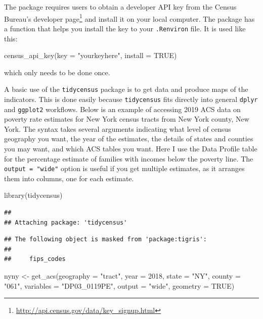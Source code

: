 \documentclass[
]{article}
\newenvironment{Shaded}{\begin{snugshade}}{\end{snugshade}}
\newcommand{\AttributeTok}[1]{\textcolor[rgb]{0.77,0.63,0.00}{#1}}
\newcommand{\ConstantTok}[1]{\textcolor[rgb]{0.00,0.00,0.00}{#1}}
\newcommand{\DecValTok}[1]{\textcolor[rgb]{0.00,0.00,0.81}{#1}}
\newcommand{\FunctionTok}[1]{\textcolor[rgb]{0.00,0.00,0.00}{#1}}
\newcommand{\NormalTok}[1]{#1}
\newcommand{\OtherTok}[1]{\textcolor[rgb]{0.56,0.35,0.01}{#1}}
\newcommand{\StringTok}[1]{\textcolor[rgb]{0.31,0.60,0.02}{#1}}
\begin{document}
The package requires users to obtain a developer API key from the Census Bureau's developer page\footnote{\url{http://api.census.gov/data/key_signup.html}} and install it on your local computer. The package has a function that helps you install the key to your \texttt{.Renviron} file. It is used like this:

\begin{Shaded}
\begin{Highlighting}[]
\FunctionTok{census\_api\_key}\NormalTok{(}\AttributeTok{key =} \StringTok{"yourkeyhere"}\NormalTok{, }\AttributeTok{install =} \ConstantTok{TRUE}\NormalTok{)}
\end{Highlighting}
\end{Shaded}

which only needs to be done once.

A basic use of the \texttt{tidycensus} package is to get data and produce maps of the indicators. This is done easily because \texttt{tidycensus} fits directly into general \texttt{dplyr} and \texttt{ggplot2} workflows. Below is an example of accessing 2019 ACS data on poverty rate estimates for New York census tracts from New York county, New York. The syntax takes several arguments indicating what level of census geography you want, the year of the estimates, the details of states and counties you may want, and which ACS tables you want. Here I use the Data Profile table for the percentage estimate of families with incomes below the poverty line. The \texttt{output\ =\ "wide"} option is useful if you get multiple estimates, as it arranges them into columns, one for each estimate.

\begin{Shaded}
\begin{Highlighting}[]
\FunctionTok{library}\NormalTok{(tidycensus)}
\end{Highlighting}
\end{Shaded}

\begin{verbatim}
## 
## Attaching package: 'tidycensus'
\end{verbatim}

\begin{verbatim}
## The following object is masked from 'package:tigris':
## 
##     fips_codes
\end{verbatim}

\begin{Shaded}
\begin{Highlighting}[]
\NormalTok{nyny }\OtherTok{\textless{}{-}} \FunctionTok{get\_acs}\NormalTok{(}\AttributeTok{geography =} \StringTok{"tract"}\NormalTok{,}
                \AttributeTok{year =} \DecValTok{2018}\NormalTok{,}
                \AttributeTok{state =} \StringTok{"NY"}\NormalTok{,}
                \AttributeTok{county =} \StringTok{"061"}\NormalTok{,}
                \AttributeTok{variables =} \StringTok{"DP03\_0119PE"}\NormalTok{, }
                \AttributeTok{output =} \StringTok{"wide"}\NormalTok{,}
                \AttributeTok{geometry =} \ConstantTok{TRUE}\NormalTok{)}
\end{Highlighting}
\end{Shaded}
\end{document}
